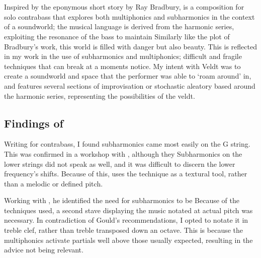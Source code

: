 \section{\bassPiece} \label{sec:bassPiece}
Inspired by the eponymous short story by Ray Bradbury, \bassPiece \space is a composition for solo contrabass that explores both multiphonics and subharmonics in the context of a soundworld; the musical language is derived from the harmonic series, exploiting the resonance of the bass to maintain
Similarly like the plot of Bradbury's work, this world is filled with danger but also beauty. 
This is reflected in my work in the use of subharmonics and multiphonics; difficult and fragile techniques that can break at a moments notice.
My intent with Veldt was to create a soundworld and space that the performer was able to `roam around' in, and features several sections of improvisation or stochastic aleatory based around the harmonic series, representing the possibilities of the veldt.

\subsection{Findings of \bassPiece}
Writing for contrabass, I found subharmonics came most easily on the G string. 
This was confirmed in a workshop with \bassParticipant, although they 
Subharmonics on the lower strings did not speak as well, and it was difficult to discern the lower frequency's shifts.
Because of this, \bassPiece \space uses the technique as a textural tool, rather than a melodic or defined pitch.

Working with \bassParticipant, he identified the need for subharmonics to be 
Because of the techniques used, a second stave displaying the music notated at actual pitch was necessary.
In contradiction of Gould's recommendations, I opted to notate it in treble clef, rather than treble transposed down an octave.\autocite[423]{gouldBars2011}
This is because the multiphonics activate partials well above those usually expected, resulting in the advice not being relevant.



